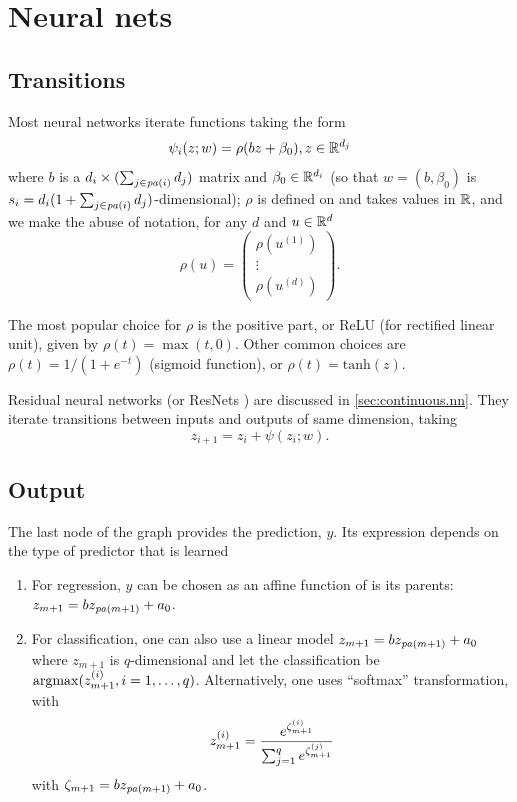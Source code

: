 \section{Neural nets}
\subsection{Transitions}
Most neural networks iterate functions taking the form 
\[
\psi_i(z;w) = \rho(bz + \beta_0), z\in{\mathbb{R}}^{d_j}
\]
where $b$ is a $d_{i}\times (\sum_{j\in {\mathit{pa}(i)}} d_j)$ matrix and $\beta_0\in {\mathbb{R}}^{d_{i}}$ (so that $w = (b, \beta_0)$ is $s_i = d_{i}(1+ \sum_{j\in {\mathit{pa}(i)}} d_j)$-dimensional);
$\rho$ is defined on and takes values in ${\mathbb{R}}$, and we make the abuse of notation, for any $d$ and $u\in {\mathbb{R}}^d$
\[
\rho(u) = \begin{pmatrix} \rho(u^{(1)}) \\\vdots\\ \rho(u^{(d)})\end{pmatrix}.
\]


 The most popular choice for $\rho$ is the positive part, or ReLU (for rectified linear unit), given by $\rho(t) = \max(t,0)$.
 Other common choices are $\rho(t) =  1/(1+e^{-t})$ (sigmoid function), or $\rho(t) = \mathrm{tanh} (z)$.

Residual neural networks (or ResNets \cite{he2016deep}) are discussed in \cref{sec:continuous.nn}. They iterate transitions between inputs and outputs of same dimension, taking 
\begin{equation}
\label{eq:resnet}
z_{i+1} = z_i + \psi(z_i;w) .
\end{equation}





\subsection{Output}
The last node of the graph provides the prediction, $y$. Its expression depends on the type of predictor that is learned
\begin{enumerate}[label=$\bullet$, wide=0.5cm]
\item  For regression, $y$ can be chosen as an affine function of is its parents: $z_{m+1} = b z_{{\mathit{pa}(m+1)}} + a_0$.
\item For classification, one can also use a linear model  $z_{m+1} = b z_{{\mathit{pa}(m+1)}} + a_0$ where $z_{m+1}$ is $q$-dimensional and let the classification be  $\operatorname*{argmax}(z_{m+1}^{(i)}, i=1, \ldots, q)$. Alternatively, one  uses ``softmax'' transformation, with 
\[
z_{m+1}^{(i)} = \frac{e^{\zeta_{m+1}^{(i)}}}{\sum_{j=1}^q e^{ \zeta_{m+1}^{(j)} }}
\] 
with  $\zeta_{m+1} = b z_{{\mathit{pa}(m+1)}} + a_0$.
\end{enumerate}

